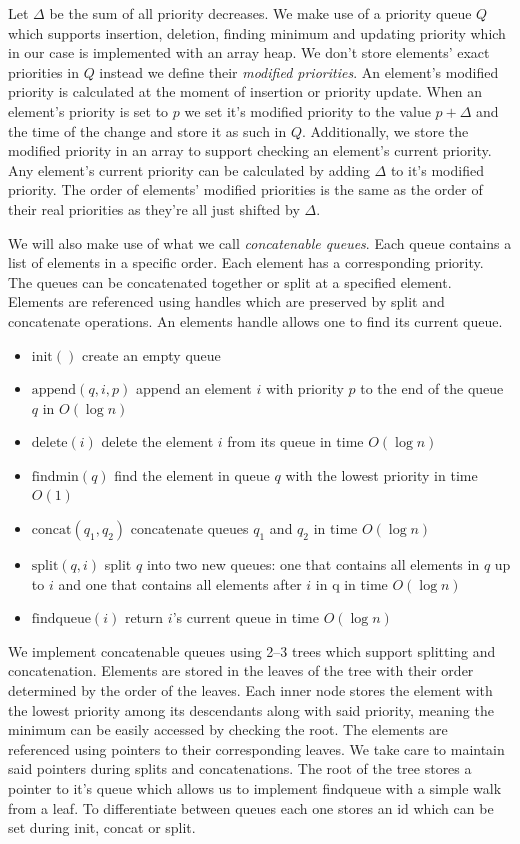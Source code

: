Let $\Delta$ be the sum of all priority decreases. We make use of a priority queue $Q$ which supports insertion, deletion, finding minimum and updating priority which in our case is implemented with an array heap. We don't store elements' exact priorities in $Q$ instead we define their \textit{modified priorities}. An element's modified priority is calculated at the moment of insertion or priority update. When an element's priority is set to $p$ we set it's modified priority to the value $p + \Delta$ and the time of the change and store it as such in $Q$. Additionally, we store the modified priority in an array to support checking an element's current priority. Any element's current priority can be calculated by adding $\Delta$ to it's modified priority. The order of elements' modified priorities is the same as the order of their real priorities as they're all just shifted by $\Delta$.

We will also make use of what we call \textit{concatenable queues}. Each queue contains a list of elements in a specific order. Each element has a corresponding priority. The queues can be concatenated together or split at a specified element. Elements are referenced using handles which are preserved by split and concatenate operations. An elements handle allows one to find its current queue.

\begin{itemize}
    \item $\text{init}()$ create an empty queue
    \item $\text{append}(q, i, p)$ append an element $i$ with priority $p$ to the end of the queue $q$ in $O(\log n)$
    \item $\text{delete}(i)$ delete the element $i$ from its queue in time $O(\log n)$
    \item $\text{findmin}(q)$ find the element in queue $q$ with the lowest priority in time $O(1)$
    \item $\text{concat}(q_1, q_2)$ concatenate queues $q_1$ and $q_2$ in time $O(\log n)$
    \item $\text{split}(q, i)$ split $q$ into two new queues: one that contains all elements in $q$ up to $i$ and one that contains all elements after $i$ in q in time $O(\log n)$
    \item $\text{findqueue}(i)$ return $i$'s current queue in time $O(\log n)$
\end{itemize}

We implement concatenable queues using 2–3 trees which support splitting and concatenation. Elements are stored in the leaves of the tree with their order determined by the order of the leaves. Each inner node stores the element with the lowest priority among its descendants along with said priority, meaning the minimum can be easily accessed by checking the root. The elements are referenced using pointers to their corresponding leaves. We take care to maintain said pointers during splits and concatenations. The root of the tree stores a pointer to it's queue which allows us to implement findqueue with a simple walk from a leaf. To differentiate between queues each one stores an id which can be set during init, concat or split.

